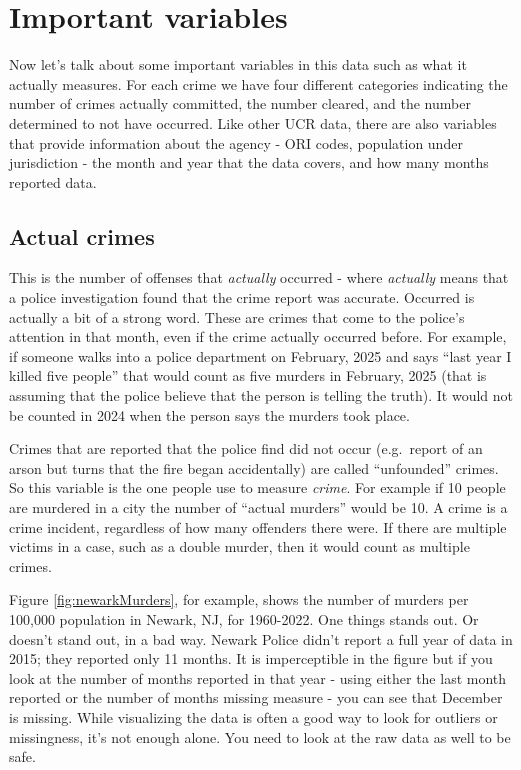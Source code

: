 \documentclass[
]{krantz}
\begin{document}
\section{Important variables}\label{important-variables}

Now let's talk about some important variables in this data
such as what it actually measures. For each crime we have
four different categories indicating the number of crimes
actually committed, the number cleared, and the number
determined to not have occurred. Like other UCR data, there
are also variables that provide information about the agency
- ORI codes, population under jurisdiction - the month and
year that the data covers, and how many months reported
data.

\subsection{Actual crimes}\label{actual}

This is the number of offenses that \emph{actually} occurred
- where \emph{actually} means that a police investigation
found that the crime report was accurate. Occurred is
actually a bit of a strong word. These are crimes that come
to the police's attention in that month, even if the crime
actually occurred before. For example, if someone walks into
a police department on February, 2025 and says ``last year I
killed five people'' that would count as five murders in
February, 2025 (that is assuming that the police believe
that the person is telling the truth). It would not be
counted in 2024 when the person says the murders took place.

Crimes that are reported that the police find did not occur
(e.g.~report of an arson but turns that the fire began
accidentally) are called ``unfounded'' crimes. So this
variable is the one people use to measure \emph{crime}. For
example if 10 people are murdered in a city the number of
``actual murders'' would be 10. A crime is a crime incident,
regardless of how many offenders there were. If there are
multiple victims in a case, such as a double murder, then it
would count as multiple crimes.

Figure \ref{fig:newarkMurders}, for example, shows the
number of murders per 100,000 population in Newark, NJ, for
1960-2022. One things stands out. Or doesn't stand out, in a
bad way. Newark Police didn't report a full year of data in
2015; they reported only 11 months. It is imperceptible in
the figure but if you look at the number of months reported
in that year - using either the last month reported or the
number of months missing measure - you can see that December
is missing. While visualizing the data is often a good way
to look for outliers or missingness, it's not enough alone.
You need to look at the raw data as well to be safe.
\end{document}
